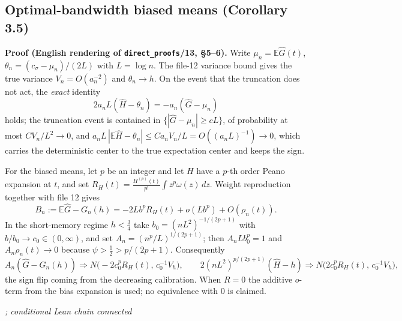 \documentclass[11pt]{article}
\theoremstyle{definition}
\theoremstyle{remark}
\newcommand{\statustag}[1]{%
  \par\nobreak\begingroup\footnotesize\itshape\raggedleft #1\par\endgroup}
\newcommand{\Wwritten}{[written]}
\begin{document}
\subsection{Optimal-bandwidth biased means (Corollary 3.5)}
\textbf{Proof (English rendering of \texttt{direct\_proofs}/13, \S5--6).}
Write $\mu_n=\mathbb E\widehat G(t)$, $\theta_n=(c_\sigma-\mu_n)/(2L)$ with
$L=\log n$. The file-12 variance bound gives the true variance
$V_n=O(a_n^{-2})$ and $\theta_n\to h$. On the event that the truncation does
not act, the \emph{exact} identity
\[
2a_nL(\widehat H-\theta_n)=-a_n(\widehat G-\mu_n)
\]
holds; the truncation event is contained in
$\{|\widehat G-\mu_n|\ge cL\}$, of probability at most $CV_n/L^2\to0$, and
$a_nL\,|\mathbb E\widehat H-\theta_n|\le Ca_nV_n/L=O((a_nL)^{-1})\to0$,
which carries the deterministic center to the true expectation center and
keeps the sign.

For the biased means, let $p$ be an integer and let $H$ have a $p$-th order
Peano expansion at $t$, and set
$R_H(t)=\frac{H^{(p)}(t)}{p!}\int z^p\omega(z)\,dz$. Weight reproduction
together with file 12 gives
\[
B_n:=\mathbb E\widehat G-G_n(h)=-2Lb^{p}R_H(t)+o(Lb^{p})+O(\rho_n(t)) .
\]
In the short-memory regime $h<\tfrac34$ take $b_0=(nL^2)^{-1/(2p+1)}$
with $b/b_0\to c_0\in(0,\infty)$, and set $A_n=(n^{p}/L)^{1/(2p+1)}$; then
$A_nLb_0^{p}=1$ and $A_n\rho_n(t)\to0$ because
$\psi>\tfrac12>p/(2p+1)$. Consequently
\[
A_n(\widehat G-G_n(h))\Rightarrow
N\bigl(-2c_0^{p}R_H(t),\,c_0^{-1}V_h\bigr),
\qquad
2(nL^2)^{p/(2p+1)}(\widehat H-h)\Rightarrow
N\bigl(2c_0^{p}R_H(t),\,c_0^{-1}V_h\bigr),
\]
the sign flip coming from the decreasing calibration. When $R=0$ the
additive $o$-term from the bias expansion is used; no equivalence with $0$
is claimed.
\statustag{\Wwritten; conditional Lean chain connected}

\smallskip{}
\end{document}
